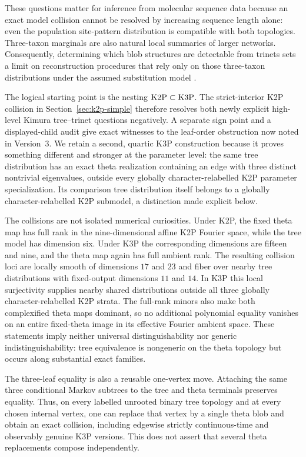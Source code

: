\documentclass[11pt]{article}
\theoremstyle{remark}\newtheorem{remark}[theorem]{Remark}
\begin{document}
These questions matter for inference from molecular sequence data because an exact model collision cannot be resolved by increasing sequence length alone: even the population site-pattern distribution is compatible with both topologies. Three-taxon marginals are also natural local summaries of larger networks. Consequently, determining which blob structures are detectable from trinets sets a limit on reconstruction procedures that rely only on those three-taxon distributions under the assumed substitution model \cite{GrossLong2018}.

The logical starting point is the nesting $\mathrm{K2P}\subset\mathrm{K3P}$. The strict-interior K2P collision in Section~\ref{sec:k2p-simple} therefore resolves both newly explicit high-level Kimura tree--trinet questions negatively. A separate sign point and a displayed-child audit give exact witnesses to the leaf-order obstruction now noted in Version~3. We retain a second, quartic K3P construction because it proves something different and stronger at the parameter level: the same tree distribution has an exact theta realization containing an edge with three distinct nontrivial eigenvalues, outside every globally character-relabelled K2P parameter specialization. Its comparison tree distribution itself belongs to a globally character-relabelled K2P submodel, a distinction made explicit below.

The collisions are not isolated numerical curiosities. Under K2P, the fixed theta map has full rank in the nine-dimensional affine K2P Fourier space, while the tree model has dimension six. Under K3P the corresponding dimensions are fifteen and nine, and the theta map again has full ambient rank. The resulting collision loci are locally smooth of dimensions $17$ and $23$ and fiber over nearby tree distributions with fixed-output dimensions $11$ and $14$. In K3P this local surjectivity supplies nearby shared distributions outside all three globally character-relabelled K2P strata. The full-rank minors also make both complexified theta maps dominant, so no additional polynomial equality vanishes on an entire fixed-theta image in its effective Fourier ambient space. These statements imply neither universal distinguishability nor generic indistinguishability: tree equivalence is nongeneric on the theta topology but occurs along substantial exact families.

The three-leaf equality is also a reusable one-vertex move. Attaching the same three conditional Markov subtrees to the tree and theta terminals preserves equality. Thus, on every labelled unrooted binary tree topology and at every chosen internal vertex, one can replace that vertex by a single theta blob and obtain an exact collision, including edgewise strictly continuous-time and observably genuine K3P versions. This does not assert that several theta replacements compose independently.
\end{document}
